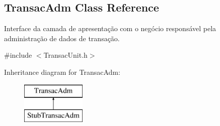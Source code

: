 \hypertarget{classTransacAdm}{\subsection{Transac\-Adm Class Reference}
\label{da/deb/classTransacAdm}
}


Interface da camada de apresentação com o negócio responsável pela administração de dados de transação.  




{\ttfamily \#include $<$Transac\-Unit.\-h$>$}

Inheritance diagram for Transac\-Adm\-:\begin{figure}[H]
\begin{center}
\leavevmode
\includegraphics[height=2.000000cm]{da/deb/classTransacAdm}
\end{center}
\end{figure}
